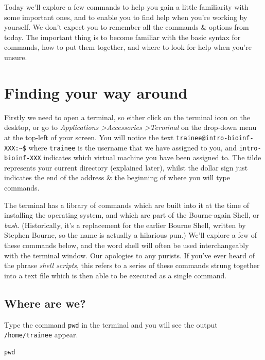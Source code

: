 Today we'll explore a few commands to help you gain a little familiarity with some important ones, and to enable you to find help when you're working by yourself.
We don't expect you to remember all the commands \& options from today.
The important thing is to become familiar with the basic syntax for commands, how to put them together, and where to look for help when you're unsure.


\clearpage
\section{Finding your way around}
\begin{steps}
Firstly we need to open a terminal, so either click on the terminal icon on the desktop, or go to \textit{Applications \textgreater Accessories \textgreater Terminal} on the drop-down menu at the top-left of your screen.
You will notice the text \texttt{trainee@intro-bioinf-XXX:\~{}\$} where \texttt{trainee} is the username that we have assigned to you, and \texttt{intro-bioinf-XXX} indicates which virtual machine you have been assigned to.
The tilde represents your current directory (explained later), whilst the dollar sign just indicates the end of the address \& the beginning of where you will type commands. \\
\end{steps}

\begin{note}
The terminal has a library of commands which are built into it at the time of installing the operating system, and which are part of the Bourne-again Shell, or \textit{bash}.
(Historically, it's a replacement for the earlier Bourne Shell, written by Stephen Bourne, so the name is actually a hilarious pun.)
We'll explore a few of these commands below, and the word shell will often be used interchangeably with the terminal window.
Our apologies to any purists.
If you've ever heard of the phrase \textit{shell scripts}, this refers to a series of these commands strung together into a text file which is then able to be executed as a single command.
\end{note}

\subsection{Where are we?}
\begin{steps}
Type the command \texttt{pwd} in the terminal and you will see the output \texttt{/home/trainee} appear.
\begin{lstlisting}
pwd
\end{lstlisting}
\end{steps}

